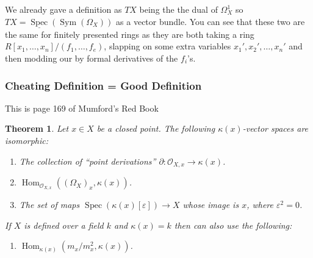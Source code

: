 \documentclass[12pt]{article}
\numberwithin{equation}{section}
\newtheorem{theorem}{Theorem}[subsection]
\theoremstyle{definition}
\theoremstyle{remark}
\newcommand{\Hom}{\operatorname{Hom}}
\newcommand{\Ocal}{\mathcal{O}}
\newcommand{\Spec}{\operatorname{Spec}}
\newcommand{\Sym}{\operatorname{Sym}}
\begin{document}
We already gave a definition as $TX$ being the the dual of $\Omega_{X}^1$ so $TX=\underline{\Spec}(\Sym(\Omega_X))$ as a vector bundle.
You can see that these two are the same for finitely presented rings as they are both taking a ring $R[x_1,\ldots,x_n]/(f_1,\ldots,f_e)$, slapping on some extra variables $x_1',x_2',\ldots,x_n'$ and then modding our by formal derivatives of the $f_i$'s.

\subsubsection{Cheating Definition = Good Definition}

This is page 169 of Mumford's Red Book
\begin{theorem}
	Let $x\in X$ be a closed point. 
	The following $\kappa(x)$-vector spaces are isomorphic:
	\begin{enumerate}
		\item The collection of ``point derivations'' $\partial:\Ocal_{X,x}\to \kappa(x)$. 
		\item $\Hom_{\Ocal_{X,x}}((\Omega_{X})_x, \kappa(x))$.
		\item The set of maps $\Spec(\kappa(x)[\varepsilon]) \to X$ whose image is $x$, where $\varepsilon^2=0$.
	\end{enumerate}
If $X$ is defined over a field $k$ and $\kappa(x)=k$ then can also use the following:
\begin{enumerate}[resume]
		\item $\Hom_{\kappa(x)}(m_x/m_x^2,\kappa(x))$.
	\end{enumerate}
\end{theorem}
\end{document}
